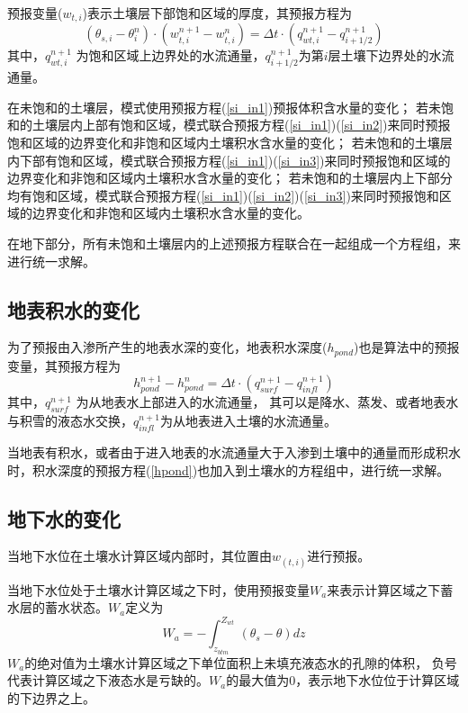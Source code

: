 预报变量($w_{t,i}$)表示土壤层下部饱和区域的厚度，其预报方程为
\begin{equation}\label{si_in3}
\left(\theta_{s, i}-\theta_{i}^{n}\right) \cdot\left(w_{t, i}^{n+1}-w_{t, i}^{n}\right)=\Delta t \cdot\left(q_{w t, i}^{n+1}-q_{i+1 / 2}^{n+1}\right)
\end{equation}
其中，$q_{wt,i}^{n+1}$  为饱和区域上边界处的水流通量，$q_{i+1/2}^{n+1}$为第$i$层土壤下边界处的水流通量。


在未饱和的土壤层，模式使用预报方程(\ref{si_in1})预报体积含水量的变化；
若未饱和的土壤层内上部有饱和区域，模式联合预报方程(\ref{si_in1})(\ref{si_in2})来同时预报饱和区域的边界变化和非饱和区域内土壤积水含水量的变化；
若未饱和的土壤层内下部有饱和区域，模式联合预报方程(\ref{si_in1})(\ref{si_in3})来同时预报饱和区域的边界变化和非饱和区域内土壤积水含水量的变化；
若未饱和的土壤层内上下部分均有饱和区域，模式联合预报方程(\ref{si_in1})(\ref{si_in2})(\ref{si_in3})来同时预报饱和区域的边界变化和非饱和区域内土壤积水含水量的变化。


在地下部分，所有未饱和土壤层内的上述预报方程联合在一起组成一个方程组，来进行统一求解。

\subsection{地表积水的变化}
为了预报由入渗所产生的地表水深的变化，地表积水深度($h_{pond}$)也是算法中的预报变量，其预报方程为
\begin{equation}\label{hpond}
h_{ {pond }}^{n+1}-h_{ {pond }}^{n}=\Delta t \cdot\left(q_{ {surf }}^{n+1}-q_{ {infl }}^{n+1}\right)
\end{equation}
其中，$q_{surf}^{n+1} $ 为从地表水上部进入的水流通量，
其可以是降水、蒸发、或者地表水与积雪的液态水交换，$q_{infl}^{n+1}$为从地表进入土壤的水流通量。


当地表有积水，或者由于进入地表的水流通量大于入渗到土壤中的通量而形成积水时，积水深度的预报方程(\ref{hpond})也加入到土壤水的方程组中，进行统一求解。


\subsection{地下水的变化}
当地下水位在土壤水计算区域内部时，其位置由$w_{(t,i)}$进行预报。


当地下水位处于土壤水计算区域之下时，使用预报变量$W_a$来表示计算区域之下蓄水层的蓄水状态。$W_a$定义为
\begin{equation}
W_{a}=-\int_{z_{b t m}}^{Z_{w t}}\left(\theta_{s}-\theta\right) d z
\end{equation}
$W_a$的绝对值为土壤水计算区域之下单位面积上未填充液态水的孔隙的体积，
负号代表计算区域之下液态水是亏缺的。$W_a$的最大值为0，表示地下水位位于计算区域的下边界之上。


